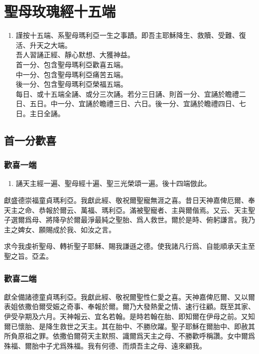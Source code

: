 \chapter[玫瑰經]{聖母玫瑰經十五端}
\begin{enumerate}
    \item[]{\small 謹按十五端、系聖母瑪利亞一生之事蹟。即吾主耶穌降生、救贖、受難、復活、升天之大端。\\
    吾人習誦正經、靜心默想、大獲神益。\\
    首一分、{\cspace}包含聖母瑪利亞歡喜五端。\\
    中一分、{\cspace}包含聖母瑪利亞痛苦五端。\\
    後一分、{\cspace}包含聖母瑪利亞榮福五端。\\
    每日、或十五端全誦、或分三次誦。若分三日誦、則首一分、宜誦於瞻禮二日、五日。中一分、宜誦於瞻禮三日、六日。後一分、宜誦於瞻禮四日、七日。主日全誦。}
\end{enumerate}

\section*{首一分歡喜}
\subsection*{歡喜一端}
\begin{enumerate}
    \item[]{\small 誦天主經一遍、聖母經十遍、聖三光榮頌一遍。後十四端倣此。}
\end{enumerate}
獻{\cspace}盛德崇福童貞瑪利亞。我獻此經、敬祝爾聖寵無涯之喜。昔日天神嘉俾厄爾、奉天主之命、恭報於爾云、萬福、瑪利亞。滿被聖寵者、主與爾偕焉。又云、天主聖子選爾爲母、將降孕於爾最淨最純之聖胎、爲人救世。爾於是時、俯躬謙言。我乃主之婢女、願賜成於我、如汝之言。

求{\cspace}今我虔祈聖母、轉祈聖子耶穌、賜我謙遜之德。使我諸凡行爲、自能順承天主至聖之旨。亞孟。

\subsection*{歡喜二端}
獻{\cspace}全備諸德童貞瑪利亞。我獻此經、敬祝爾聖性仁愛之喜。天神嘉俾厄爾、又以爾表姐依撒伯爾受娠之奇事、奉報於爾。爾乃大發熱愛之情、速行往顧。既至其家、伊受孕期及六月。天神報云、宜名若翰。是時若翰在胎、即知爾在伊母之前。又知爾已懷胎、是降生救世之天主。其在胎中、不勝欣躍。聖子耶穌在爾胎中、即赦其所負原祖之罪。依撒伯爾荷天主默照、識爾爲天主之母、不勝歡呼稱讚。女中爾爲殊福、爾胎中子尤爲殊福。我有何德、而煩吾主之母、遠來顧我。

